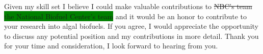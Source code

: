 \documentclass[11pt,a4paper,sans]{moderncv}
\begin{document}
\begin{spacing}{1.15}
Given my skill set I believe I could make valuable contributions to \sout{NBC's team} \colorbox{green}{the National Biofuel Center's team} and it would be an honor to contribute to your research into algal biofuels. 
If you agree, I would appreciate the opportunity to discuss any potential position and my contributions in more detail. 
Thank you for your time and consideration, I look forward to hearing from you.


 

\end{spacing}
\makeletterclosing
\end{document}
